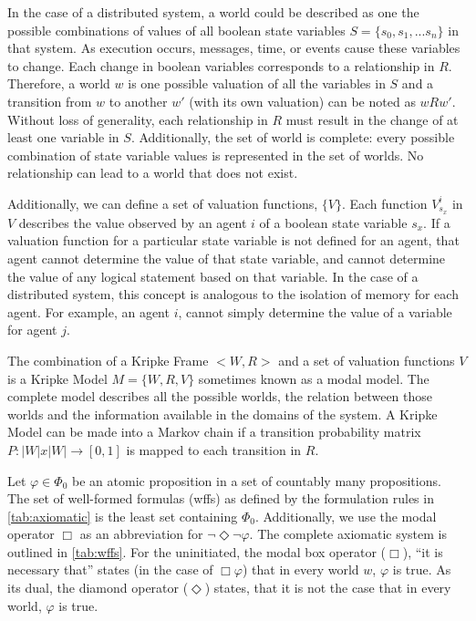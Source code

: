 In the case of a distributed system, a world could be described as one the possible combinations of values of all boolean state variables $S=\{s_0, s_1, ... s_n\}$ in that system.
As execution occurs, messages, time, or events cause these variables to change.
Each change in boolean variables corresponds to a relationship in $R$\cite{Gehrke200565}.
Therefore, a world $w$ is one possible valuation of all the variables in $S$ and a transition from $w$ to another $w'$ (with its own valuation) can be noted as $wRw'$.
Without loss of generality, each relationship in $R$ must result in the change of at least one variable in $S$.
Additionally, the set of world is complete: every possible combination of state variable values is represented in the set of worlds.
No relationship can lead to a world that does not exist.

Additionally, we can define a set of valuation functions, $\{V\}$.
Each function $V^i_{s_x}$ in $V$ describes the value observed by an agent $i$ of a boolean state variable $s_x$. 
If a valuation function for a particular state variable is not defined for an agent, that agent cannot determine the value of that state variable, and cannot determine the value of any logical statement based on that variable.
In the case of a distributed system, this concept is analogous to the isolation of memory for each agent.
For example, an agent $i$, cannot simply determine the value of a variable for agent $j$.

The combination of a Kripke Frame $< W,R >$ and a set of valuation functions ${V}$ is a Kripke Model $M = \{W, R, V\}$ sometimes known as a modal model.
The complete model describes all the possible worlds, the relation between those worlds and the information available in the domains of the system.
A Kripke Model can be made into a Markov chain if a transition probability matrix $P : |W| x |W| \rightarrow [0,1]$ is mapped to each transition in $R$.\cite{kripkemarkov1}\cite{kripkemarkov2}

Let $\varphi \in \Phi_0$ be an atomic proposition in a set of countably many propositions.
The set of well-formed formulas (wffs) as defined by the formulation rules in \ref{tab:axiomatic} is the least set containing $\Phi_0$.
Additionally, we use the modal operator $\Box$ as an abbreviation for $\neg \Diamond \neg \varphi$.
The complete axiomatic system is outlined in \ref{tab:wffs}.
For the uninitiated, the modal box operator ($\Box$), ``it is necessary that'' states (in the case of $\Box \varphi$) that in every world $w$, $\varphi$ is true. As its dual, the diamond operator ($\Diamond$) states, that it is not the case that in every world, $\varphi$ is true.

